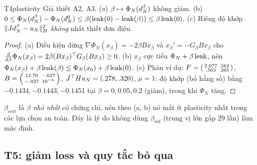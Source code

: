 \begin{namedthm}{T4}{plasticity}
Giả thiết A2, A3.
(a) $\beta\mapsto\Phi_N(d_N^{\beta})$ không giảm.
(b) $0\le\Phi_N(d_N^{\beta})-\Phi_N(d_N^0)\le\beta(\operatorname{leak}(0)-\operatorname{leak}(\beta))\le\beta\operatorname{leak}(0)$.
(c) Riêng độ khớp $\lVert Jd_N^{\beta}-u_N\rVert_H^2$ \emph{không} nhất thiết đơn điệu.
\end{namedthm}
\begin{proof}
(a) Điều kiện dừng $\nabla\Phi_N(x_\beta)=-2\beta Bx_\beta$ và $x_\beta'=-G_\beta Bx_\beta$ cho $\frac{d}{d\beta}\Phi_N(x_\beta)=2\beta(Bx_\beta)^{\top} G_\beta(Bx_\beta)\ge0$.
(b) $x_\beta$ cực tiểu $\Phi_N+\beta\operatorname{leak}$, nên $\Phi_N(x_\beta)+\beta\operatorname{leak}(\beta)\le\Phi_N(x_0)+\beta\operatorname{leak}(0)$.
(c) Phản ví dụ: $F=\begin{psmallmatrix}2.077&.563\\.563&.265\end{psmallmatrix}$, $B=\begin{psmallmatrix}12.70&-.027\\-.027&10^{-4}\end{psmallmatrix}$, $J^{\top} Hu_N=(.278,.320)$, $\mu=1$: độ khớp (bỏ hằng số) bằng $-0.1434,-0.1443,-0.1451$ tại $\beta=0,0.05,0.2$ (giảm), trong khi $\Phi_N$ tăng.
\end{proof}
\begin{hequa}
$\beta_{\mathrm{cert}}$ là $\beta$ \emph{nhỏ nhất} có chứng chỉ, nên theo (a, b) nó mất ít plasticity nhất trong các lựa chọn an toàn. Đây là lý do không dùng $\beta_{\mathrm{suf}}$ (trung vị lớn gấp 29 lần) làm mặc định.
\end{hequa}

\subsection{T5: giảm loss và quy tắc bỏ qua}

